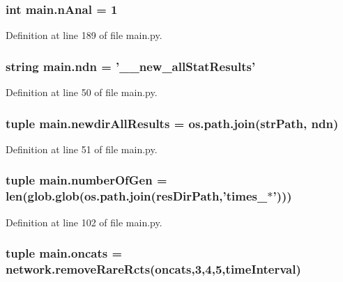 \hypertarget{a00117_ae7ca1c378927da05feb71e5a9f775afb}{
\subsubsection[{n\-Anal}]{\setlength{\rightskip}{0pt plus 5cm}int main.\-n\-Anal = 1}}\label{a00117_ae7ca1c378927da05feb71e5a9f775afb}


Definition at line 189 of file main.\-py.

\hypertarget{a00117_acaa3f6fffb18a543c7c04d985e77fa6f}{
\subsubsection[{ndn}]{\setlength{\rightskip}{0pt plus 5cm}string main.\-ndn = '\-\_\-\_\-new\-\_\-all\-Stat\-Results'}}\label{a00117_acaa3f6fffb18a543c7c04d985e77fa6f}


Definition at line 50 of file main.\-py.

\hypertarget{a00117_af73b43f5468097ae9443adeb6010a75c}{
\subsubsection[{newdir\-All\-Results}]{\setlength{\rightskip}{0pt plus 5cm}tuple main.\-newdir\-All\-Results = os.\-path.\-join({\bf str\-Path}, {\bf ndn})}}\label{a00117_af73b43f5468097ae9443adeb6010a75c}


Definition at line 51 of file main.\-py.

\hypertarget{a00117_aabf82b9e9c2293000a67162becdd440d}{
\subsubsection[{number\-Of\-Gen}]{\setlength{\rightskip}{0pt plus 5cm}tuple main.\-number\-Of\-Gen = len(glob.\-glob(os.\-path.\-join({\bf res\-Dir\-Path},'times\-\_\-$\ast$')))}}\label{a00117_aabf82b9e9c2293000a67162becdd440d}


Definition at line 102 of file main.\-py.

\hypertarget{a00117_ab4d380bc4bfcb970acc39ddf18a73972}{
\subsubsection[{oncats}]{\setlength{\rightskip}{0pt plus 5cm}tuple main.\-oncats = network.\-remove\-Rare\-Rcts(oncats,3,4,5,{\bf time\-Interval})}}\label{a00117_ab4d380bc4bfcb970acc39ddf18a73972}


